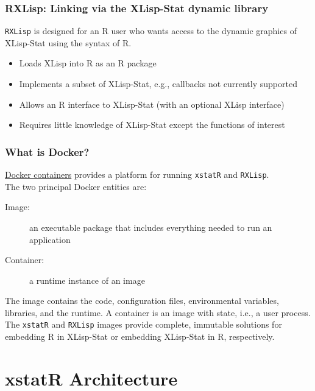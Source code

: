 \documentclass{beamer}
\begin{document}
\begin{frame}
\frametitle{RXLisp: Linking via the XLisp-Stat dynamic library}
\texttt{RXLisp} is designed for an R user who wants access to the dynamic graphics of XLisp-Stat using the syntax of R.
\begin{itemize}
	\item Loads XLisp into R as an R package
	\item Implements a subset of XLisp-Stat, e.g., callbacks not currently supported
	\item Allows an R interface to XLisp-Stat (with an optional XLisp interface)
	\item Requires little knowledge of XLisp-Stat except the functions of interest
\end{itemize}
\end{frame}

\begin{frame}
\frametitle{What is Docker?}

\href{https://www.docker.com/what-docker\#/container-platform}{Docker containers} provides a platform for running \texttt{xstatR} and \texttt{RXLisp}.\\
\vspace{0.5 cm}
The two principal Docker entities are:
\begin{description}
	\item[Image:] an executable package that includes everything needed to run an application 
	\item[Container:] a runtime instance of an image
\end{description}
The image contains the code, configuration files, environmental variables, libraries, and the runtime. A container is an image with state, i.e., a user process.\\
\vspace{0.5 cm}
The \texttt{xstatR} and \texttt{RXLisp} images provide complete, immutable solutions for embedding R in XLisp-Stat or embedding XLisp-Stat in R, respectively.

\end{frame}

\section{xstatR Architecture}
\end{document}
